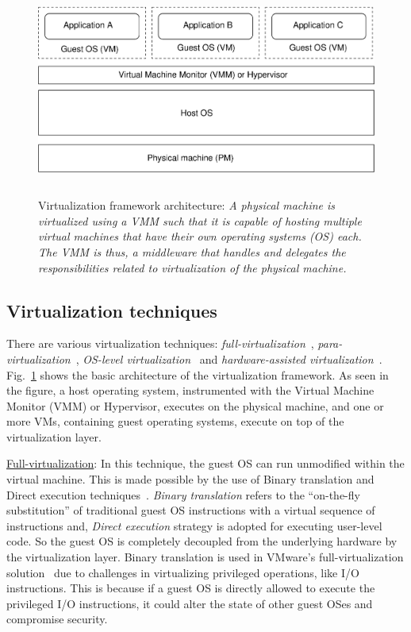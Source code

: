 \begin{figure}[t]
\begin{center}
\includegraphics[height=7cm, width=14cm]{first-aps-figures/virtualization-arch.eps}
\caption{Virtualization framework architecture: \textit{A physical machine is 
virtualized using a VMM such that it is capable of hosting multiple virtual 
machines that have their own operating systems (OS) each. The VMM is thus, a
middleware that handles and delegates the responsibilities related to virtualization
of the physical machine.}} 
\label{virtualization-arch}
\end{center}
\end{figure}

\subsection{Virtualization techniques}
\label{virtualization-tech}
There are various virtualization techniques: \textit{full-virtualization}~\cite{vmware-paravirtualization},
\textit{para-virtualization}~\cite{xen}, \textit{OS-level
virtualization}~\cite{quantifying-the-performance-isolation-properties}
and \textit{hardware-assisted virtualization}~\cite{kvm}.
Fig.~\ref{virtualization-arch} shows the basic architecture of the
virtualization framework. As seen in the figure, a host operating
system, instrumented with the 
Virtual Machine Monitor (VMM) or Hypervisor,
executes on the physical machine, 
and one or more VMs, containing guest operating systems, execute on top 
of the virtualization layer.


\underline{Full-virtualization}: In 
this technique, the guest 
OS can run unmodified within the virtual machine. This is made 
possible by the use of Binary translation and
Direct execution techniques~\cite{vmware-paravirtualization}. 
\textit{Binary translation} refers to the ``on-the-fly substitution'' 
of traditional guest OS instructions with a virtual sequence of 
instructions and, \textit{Direct execution}
strategy is adopted for executing user-level code. So the
guest OS is completely decoupled from the underlying hardware by the
virtualization layer.
Binary translation is used in VMware's full-virtualization 
solution~\cite{vmware-paravirtualization} due to challenges
in virtualizing privileged operations, like I/O instructions. This is
because if a guest OS is directly allowed to execute the privileged I/O
instructions, it could alter the
state of other guest OSes and compromise security. 

